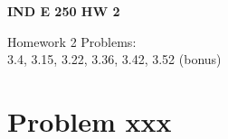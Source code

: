 \documentclass{report} %
\begin{document}
\newpage

\begin{center}
    \LARGE{\textbf{IND E 250 HW 2}}
\end{center}
\begin{center}
    Homework 2 Problems: \\
    3.4, 3.15, 3.22, 3.36, 3.42, 3.52 (bonus)
\end{center}
\section*{Problem xxx}

\newpage
\end{document}
